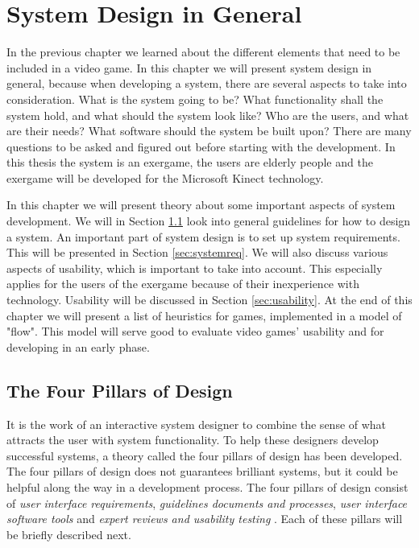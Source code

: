 \chapter{System Design in General}
\label{chap:generalsystemdesign}
In the previous chapter we learned about the different elements that need to be included in a video game. In this chapter we will present system design in general, because when developing a system, there are several aspects to take into consideration. What is the system going to be? What functionality shall the system hold, and what should the system look like? Who are the users, and what are their needs? What software should the system be built upon? There are many questions to be asked and figured out before starting with the development. In this thesis the system is an exergame, the users are elderly people and the exergame will be developed for the Microsoft Kinect technology.

In this chapter we will present theory about some important aspects of system development. We will in Section \ref{sec:fourpillarsofdesign} look into general guidelines for how to design a system. An important part of system design is to set up system requirements. This will be presented in Section \ref{sec:systemreq}. We will also discuss various aspects of usability, which is important to take into account. This especially applies for the users of the exergame because of their inexperience with technology.  Usability will be discussed in Section \ref{sec:usability}. At the end of this chapter we will present a list of heuristics for games, implemented in a model of "flow". This model will serve good to evaluate video games' usability and for developing in an early phase.

\section{The Four Pillars of Design}
\label{sec:fourpillarsofdesign}
It is the work of an interactive system designer to combine the sense of what attracts the user with system functionality. To help these designers develop successful systems, a theory called the four pillars of design has been developed. The four pillars of design does not guarantees brilliant systems, but it could be helpful along the way in a development process. The four pillars of design consist of \emph{user interface requirements}, \emph{guidelines documents and processes}, \emph{user interface software tools} and \emph{expert reviews and usability testing} \cite{mmi}. Each of these pillars will be briefly described next. 

